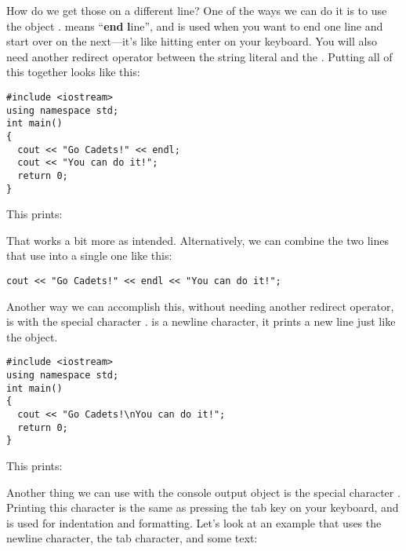 How do we get those on a different line? 
One of the ways we can do it is to use the object . 
 means ``\textbf{end} \textbf{l}ine'', and is used when you want to end one line and start over on the next---it's like hitting enter on your keyboard. 
You will also need another redirect operator between the string literal and the . 
Putting all of this together looks like this:

\noindent\begin{minipage}{\linewidth}\begin{lstlisting}
#include <iostream>
using namespace std;
int main()
{
  cout << "Go Cadets!" << endl;
  cout << "You can do it!";
  return 0;
}
\end{lstlisting}\end{minipage}

\noindent This prints:

\noindent {}

\noindent {}

That works a bit more as intended. 
Alternatively, we can combine the two lines that use  into a single one like this:

\noindent\begin{minipage}{\linewidth}\begin{lstlisting}
cout << "Go Cadets!" << endl << "You can do it!";
\end{lstlisting}\end{minipage}

Another way we can accomplish this, without needing another redirect operator, is with the special character .
 is a newline character, it prints a new line just like the  object. 

\noindent\begin{minipage}{\linewidth}\begin{lstlisting}
#include <iostream>
using namespace std;
int main()
{
  cout << "Go Cadets!\nYou can do it!";
  return 0;
}
\end{lstlisting}\end{minipage}

\noindent This prints:

\noindent {}

\noindent {}

Another thing we can use with the console output object is the special character . 
Printing this character is the same as pressing the tab key on your keyboard, and is used for indentation and formatting. 
Let's look at an example that uses the newline character, the tab character, and some text:


